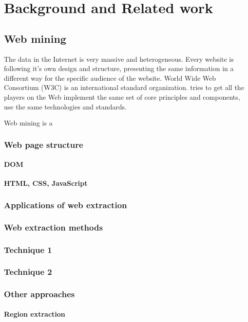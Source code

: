 \chapter{Background and Related work}
\label{chap:background}
\section{Web mining}

The data in the Internet is very massive and heterogeneous. Every website is following it's own design and structure, presenting the same information in a different way for the specific audience of the website. World Wide Web Consortium (W3C) is an international standard organization. tries to get all the players on the Web implement the same set of core principles and components, use the same technologies and standards. 

Web mining is a 
\subsection{Web page structure}
\subsubsection{DOM}
\subsubsection{HTML, CSS, JavaScript}
\subsection{Applications of web extraction}
\subsection{Web extraction methods}
\subsection{Technique 1}
\subsection{Technique 2}
\subsection{Other approaches}
\subsubsection{Region extraction}
